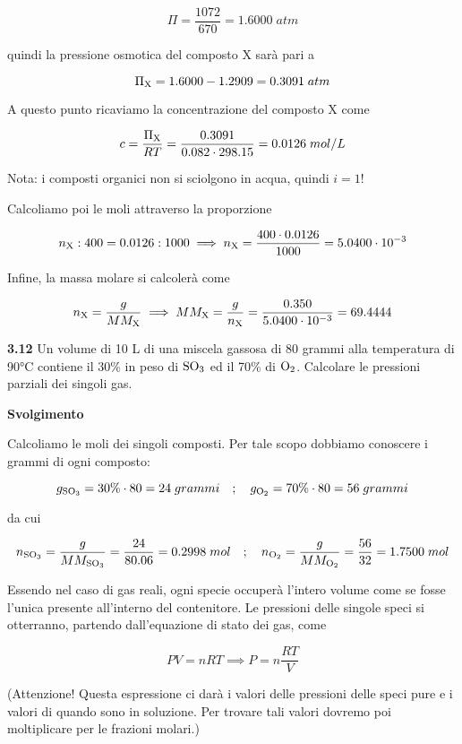 $$\Pi=\frac{1072}{670}=1.6000\;atm$$

quindi la pressione osmotica del composto X sarà pari a

$$\Pi_{\rm X}=1.6000 - 1.2909 = 0.3091\;atm$$

A questo punto ricaviamo la concentrazione del composto X come

$$c=\frac{\Pi_{\rm X}}{RT}=\frac{0.3091}{0.082 \cdot 298.15}
=0.0126\;mol/L$$

Nota: i composti organici non si sciolgono in acqua, quindi $i=1$!

Calcoliamo poi le moli attraverso la proporzione

$$n_{\rm X}:400=0.0126:1000
\implies
n_{\rm X}=\frac{400 \cdot 0.0126}{1000}
=5.0400 \cdot 10^{-3}$$

Infine, la massa molare si calcolerà come

$$n_{\rm X}=\frac{g}{MM_{\rm X}}
\implies
MM_{\rm X}=\frac{g}{n_{\rm X}}=\frac{0.350}{5.0400 \cdot 10^{-3}}=69.4444$$

\vspace{0.2cm}\textbf{3.12} Un volume di 10 L di una miscela gassosa di 80 grammi alla temperatura di 90°C contiene il
30\% in peso di $\rm SO_3$ ed il 70\% di $\rm O_2$. Calcolare le pressioni parziali dei singoli gas.

\vspace{0.2cm}\large\textbf{Svolgimento}\normalsize

\vspace{0.2cm}Calcoliamo le moli dei singoli composti. Per tale scopo dobbiamo conoscere i grammi di ogni composto:

$$g_{\rm SO_3}=30\% \cdot 80=24\;grammi
\quad;\quad
g_{\rm O_2}=70\% \cdot 80=56\;grammi$$

da cui

\vspace{-0.2cm}$$n_{\rm SO_3}=\frac{g}{MM_{\rm SO_3}}=\frac{24}{80.06}=0.2998\;mol
\quad;\quad
n_{\rm O_2}=\frac{g}{MM_{\rm O_2}}=\frac{56}{32}=1.7500\;mol$$

Essendo nel caso di gas reali, ogni specie occuperà l'intero volume come se fosse l'unica presente all'interno del contenitore. Le pressioni delle singole speci si otterranno, partendo dall'equazione di stato dei gas, come

$$PV=nRT \implies
P=n\frac{RT}{V}$$

(Attenzione! Questa espressione ci darà i valori delle pressioni delle speci pure e i valori di quando sono in soluzione. Per trovare tali valori dovremo poi moltiplicare per le frazioni molari.)

